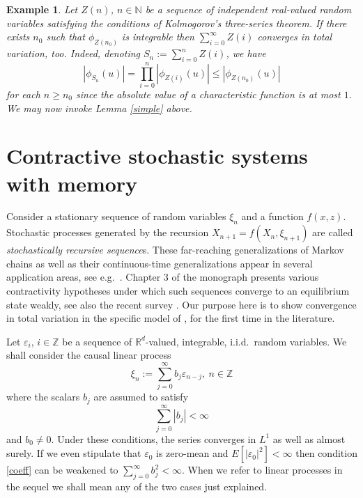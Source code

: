 \documentclass{article}
\newtheorem{example}[theorem]{Example}
\begin{document}
	
\begin{example} {\rm Let $Z(n)$, $n\in\mathbb{N}$ be a sequence of independent real-valued random variables
satisfying the conditions of Kolmogorov's three-series theorem. If there exists $n_{0}$
such that $\phi_{Z(n_{0})}$ is integrable then $\sum_{i=0}^{\infty}Z({i})$ converges in
total variation, too. Indeed, denoting $S_{n}:=\sum_{i=0}^{n}Z(i)$, we have
$$
|\phi_{S_{n}}(u)|=\prod_{i=0}^{n}|\phi_{Z(i)}(u)|\leq |\phi_{Z(n_{0})}(u)|
$$
for each $n\geq n_{0}$ since the absolute value of a characteristic function is at most $1$.
We may now invoke Lemma \ref{simple} above.}
\end{example}







\section{Contractive stochastic systems with memory}\label{contra} 

Consider a stationary sequence of random variables $\xi_{n}$ and a function $f(x,z)$. Stochastic processes
generated by the recursion $X_{n+1}=f(X_{n},\xi_{n+1})$ are called \emph{stochastically recursive sequence}s.
These far-reaching generalizations of Markov chains as well as their continuous-time generalizations appear in several application areas, 
see e.g.\ \cite{hairer,red,paolo-fad,borovkov-foss,elton}. 
Chapter 3 of the monograph \cite{borovkov} presents various contractivity 
hypotheses under which such sequences converge to an equilibrium state 
weakly, see also the recent survey \cite{gyorfi_laci}. Our purpose here is to show convergence in total variation
in the specific model of \cite{varvenne}, for
the first time in the literature.


Let $\varepsilon_{i}$, $i\in\mathbb{Z}$ be a sequence of $\mathbb{R}^{d}$-valued, integrable, i.i.d.\ random variables.
We shall consider the causal linear process 
$$
\xi_{n}:=\sum_{j=0}^{\infty}b_{j}\varepsilon_{n-j},\ n\in\mathbb{Z}
$$
where the scalars $b_{j}$ are assumed to satisfy 
\begin{equation}\label{coeff}
\sum_{j=0}^{\infty}|b_{j}|<\infty	
\end{equation} 
and $b_{0}\neq 0$.{}
Under these conditions, the series converges in $L^{1}$ as well as almost surely. If we
even stipulate that $\varepsilon_{0}$ is zero-mean and $E[|\varepsilon_{0}|^{2}]<\infty$ then condition
\eqref{coeff} can be weakened to $\sum_{j=0}^{\infty}b_{j}^{2}<\infty$. When we refer to
linear processes in the sequel we shall mean any of the two cases just explained.
\end{document}
